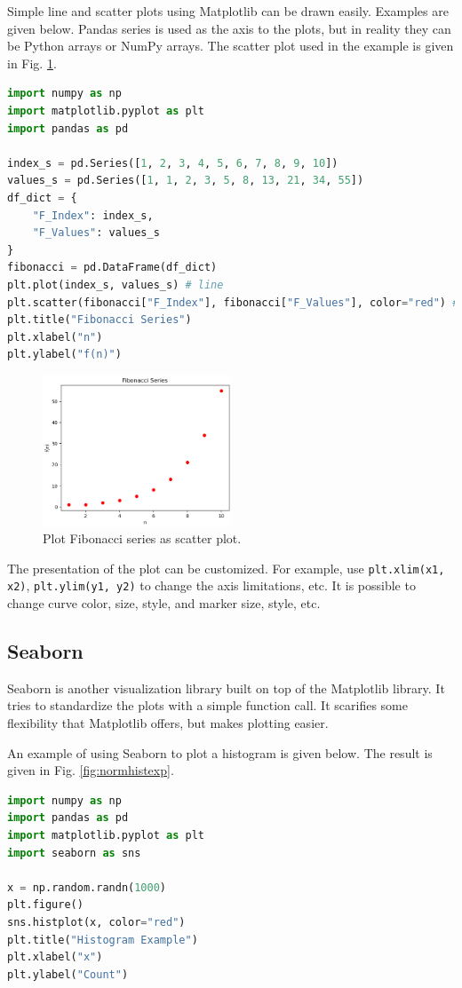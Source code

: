 Simple line and scatter plots using Matplotlib can be drawn easily. Examples are given below. Pandas series is used as the axis to the plots, but in reality they can be Python arrays or NumPy arrays. The scatter plot used in the example is given in Fig. \ref{fig:fib_exp}.
\begin{lstlisting}[language=Python]
import numpy as np
import matplotlib.pyplot as plt
import pandas as pd

index_s = pd.Series([1, 2, 3, 4, 5, 6, 7, 8, 9, 10])
values_s = pd.Series([1, 1, 2, 3, 5, 8, 13, 21, 34, 55])
df_dict = {
	"F_Index": index_s,
	"F_Values": values_s
}
fibonacci = pd.DataFrame(df_dict)
plt.plot(index_s, values_s) # line
plt.scatter(fibonacci["F_Index"], fibonacci["F_Values"], color="red") # scatter
plt.title("Fibonacci Series")
plt.xlabel("n")
plt.ylabel("f(n)")
\end{lstlisting}

\begin{figure}[htbp]
\centering
\includegraphics[width=0.5\textwidth]{./chapters/ch-python/figures/fib_exp.png}
\caption{Plot Fibonacci series as scatter plot.}
\label{fig:fib_exp}
\end{figure}

The presentation of the plot can be customized. For example, use \verb|plt.xlim(x1, x2)|, \verb|plt.ylim(y1, y2)| to change the axis limitations, etc. It is possible to change curve color, size, style, and marker size, style, etc.

\subsection{Seaborn}

Seaborn is another visualization library built on top of the Matplotlib library. It tries to standardize the plots with a simple function call. It scarifies some flexibility that Matplotlib offers, but makes plotting easier.

An example of using Seaborn to plot a histogram is given below. The result is given in Fig. \ref{fig:normhistexp}.
\begin{lstlisting}[language=Python]
import numpy as np
import pandas as pd
import matplotlib.pyplot as plt
import seaborn as sns

x = np.random.randn(1000)
plt.figure()
sns.histplot(x, color="red")
plt.title("Histogram Example")
plt.xlabel("x")
plt.ylabel("Count")
\end{lstlisting}

